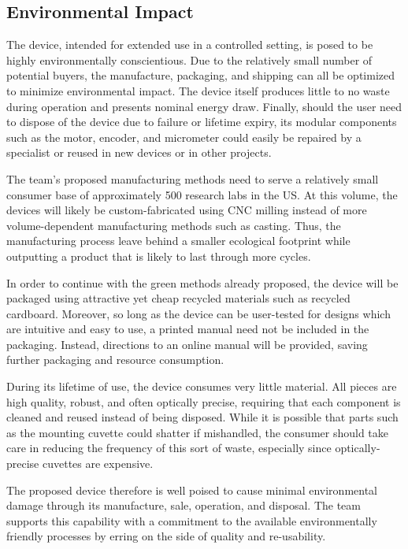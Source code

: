 \documentclass{article}
\begin{document}
\subsection{Environmental Impact}
\label{sec:environment}
 
The device, intended for extended use in a controlled setting, is
posed to be highly environmentally conscientious. Due to the
relatively small number of potential buyers, the manufacture,
packaging, and shipping can all be optimized to minimize environmental
impact. The device itself produces little to no waste during operation
and presents nominal energy draw. Finally, should the user need to
dispose of the device due to failure or lifetime expiry, its modular
components such as the motor, encoder, and micrometer could easily be
repaired by a specialist or reused in new devices or in other
projects.
 
The team's proposed manufacturing methods need to serve a relatively
small consumer base of approximately 500 research labs in the US. At
this volume, the devices will likely be custom-fabricated using CNC
milling instead of more volume-dependent manufacturing methods such as
casting. Thus, the manufacturing process leave behind a smaller
ecological footprint while outputting a product that is likely to last
through more cycles.
 
In order to continue with the green methods already proposed, the
device will be packaged using attractive yet cheap recycled materials
such as recycled cardboard. Moreover, so long as the device can be
user-tested for designs which are intuitive and easy to use, a printed
manual need not be included in the packaging. Instead, directions to
an online manual will be provided, saving further packaging and
resource consumption.
 
During its lifetime of use, the device consumes very little
material. All pieces are high quality, robust, and often optically
precise, requiring that each component is cleaned and reused instead
of being disposed. While it is possible that parts such as the
mounting cuvette could shatter if mishandled, the consumer should take
care in reducing the frequency of this sort of waste, especially since
optically-precise cuvettes are expensive.
 
The proposed device therefore is well poised to cause minimal
environmental damage through its manufacture, sale, operation, and
disposal. The team supports this capability with a commitment to the
available environmentally friendly processes by erring on the
side of quality and re-usability.
 
\end{document}
